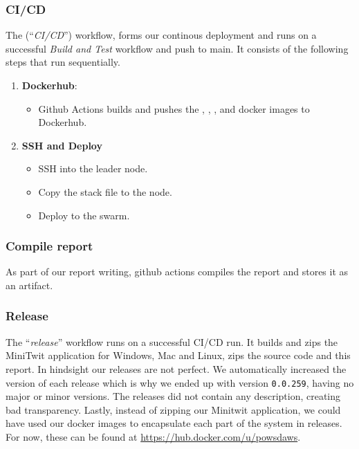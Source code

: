\subsubsection{CI/CD}
The (``\textit{CI/CD}'') workflow, forms our continous deployment and runs on a successful \textit{Build and Test} workflow and push to main. It consists of the following steps that run sequentially.
\begin{enumerate}
    \item \textbf{Dockerhub}:
    \begin{itemize}
        \item Github Actions builds and pushes the , , ,  and  docker images to Dockerhub.
    \end{itemize}
    \item \textbf{SSH and Deploy}
    \begin{itemize}
        \item SSH into the leader node.
        \item Copy the stack file  to the node.
        \item Deploy to the swarm.
    \end{itemize}
\end{enumerate}

\subsubsection{Compile report}
As part of our report writing, github actions compiles the report and stores it as an artifact.

\subsubsection{Release}\label{release}

The ``\textit{release}'' workflow runs on a successful CI/CD run. It builds and zips
the MiniTwit application for Windows, Mac and Linux, zips the source code and this report.
In hindsight our releases are not perfect.
We automatically increased the version of each release which is why we ended up with version \texttt{0.0.259}, having no major or minor versions.
The releases did not contain any description, creating bad transparency.
Lastly, instead of zipping our Minitwit application, we could have used our docker images to encapsulate each part of the system in releases.
For now, these can be found at \url{https://hub.docker.com/u/powsdaws}.

